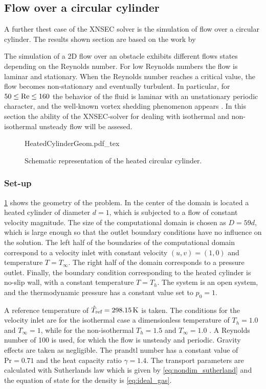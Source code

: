 \subsection{Flow over a circular cylinder}\label{ssec:FlowCircCyl}

A further thest case of the XNSEC solver is the simulation of flow over a circular cylinder. The results shown section are based on the work by \cite{miaoHighOrderSimulationLowMachFlows2022}

The simulation of a 2D flow over an obstacle exhibits different flows states depending on the Reynolds number. For low Reynolds numbers the flow is laminar and stationary. When the Reynolds number reaches a critical value, the flow becomes non-stationary and eventually turbulent. In particular, for $50 \leq \text{Re} \leq 160$ the behavior of the fluid is laminar with an unstationary periodic character, and the well-known vortex shedding phenomenon appears 	\citep{sharmaHEATFLUIDFLOW2004}. In this section the ability of the XNSEC-solver for dealing with isothermal and non-isothermal unsteady flow will be assesed. 
\begin{figure}[t!]
	\begin{center}
		\def\svgwidth{0.88\textwidth}
		{HeatedCylinderGeom.pdf_tex}
		\caption{Schematic representation of the heated circular cylinder.}
		\label{fig:CircularCylinderGeom}%
	\end{center}%
\end{figure}%
\subsubsection{Set-up}
\cref{fig:CircularCylinderGeom} shows the geometry of the problem. In the center of the domain is located a heated cylinder of diameter $d = 1$, which is subjected to a flow of constant velocity magnitude. The size of the computational domain is chosen as $D = 59d$, which is large enough so that the outlet boundary conditions have no influence on the solution. The left half of the boundaries of the computational domain correspond to a velocity inlet with constant velocity $(u,v) = (1,0)$ and temperature $T = T_\infty$. The right half of the domain corresponds to a pressure outlet. Finally, the boundary condition corresponding to the heated cylinder is no-slip wall, with a constant temperature $T = T_h$. The system is an open system, and the thermodynamic pressure has a constant value set to $p_0 = 1$.

A reference temperature of $\hat T_{\text{ref}} = \SI{298.15}{\kelvin}$ is taken. The conditions for the velocity inlet are for the isothermal case a dimensionless temperature of $T_h = 1.0$ and $T_\infty = 1$, while for the non-isothermal $T_h = 1.5$ and $T_\infty = 1.0$ . A Reynolds number of 100 is used, for which the flow is unsteady and periodic. Gravity effects are taken as negligible. The prandtl number has a constant value of $\text{Pr} = 0.71$ and the heat capacity ratio $\gamma = 1.4$. The transport parameters are calculated with Sutherlands law which is given by \cref{eq:nondim_sutherland} and the equation of state for the density is \cref{eq:ideal_gas}.

